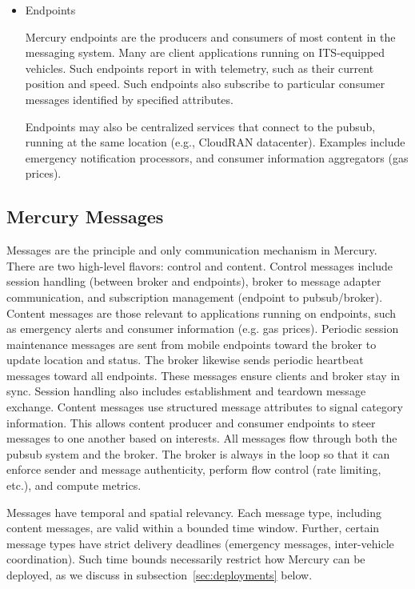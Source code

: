\begin{itemize}
\item Endpoints

Mercury endpoints are the producers and consumers of most content in
the messaging system. Many are client applications running on
ITS-equipped vehicles.  Such endpoints report in with telemetry, such
as their current position and speed.  Such endpoints also subscribe to
particular consumer messages identified by specified attributes.

Endpoints may also be centralized services that connect to the pubsub,
running at the same location (e.g., CloudRAN datacenter). Examples
include emergency notification processors, and consumer information
aggregators (gas prices).

\end{itemize}

\subsection{Mercury Messages}

Messages are the principle and only communication mechanism in
Mercury. There are two high-level flavors: control and
content. Control messages include session handling (between broker and
endpoints), broker to message adapter communication, and subscription
management (endpoint to pubsub/broker).  Content messages are those
relevant to applications running on endpoints, such as emergency
alerts and consumer information (e.g. gas prices).  Periodic session
maintenance messages are sent from mobile endpoints toward the broker
to update location and status.  The broker likewise sends periodic
heartbeat messages toward all endpoints. These messages ensure clients
and broker stay in sync. Session handling also includes establishment
and teardown message exchange.  Content messages use structured
message attributes to signal category information. This allows content
producer and consumer endpoints to steer messages to one another based
on interests. All messages flow through both the pubsub system and the
broker. The broker is always in the loop so that it can enforce sender
and message authenticity, perform flow control (rate limiting, etc.),
and compute metrics.

Messages have temporal and spatial relevancy.  Each message type,
including content messages, are valid within a bounded time
window. Further, certain message types have strict delivery deadlines
(emergency messages, inter-vehicle coordination). Such time bounds
necessarily restrict how Mercury can be deployed, as we discuss in
subsection~\ref{sec:deployments} below.

